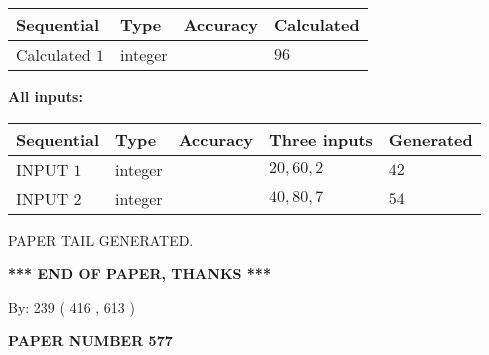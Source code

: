\documentclass{ctexart}
\begin{document}
   
   
   
\noindent{}
   
   
  
  
\noindent\begin{tabular}{|l|l|l|l|}
\hline
 Sequential & Type & Accuracy & Calculated \\ 
\hline
 
 
  Calculated $  1 $ & integer &  & 
  $ 96 $ 
 \\  \hline  
 \end{tabular}
   
   
   
   
\noindent\vspace{0.1in}\hspace{-0.08in} {\textbf{\Large{All inputs: }}}
   
   
  
  
\noindent\begin{tabular}{|l|l|l|l|l|}
\hline
 Sequential & Type & Accuracy & Three inputs & Generated \\ 
\hline
 
 
  INPUT $  1 $ & integer &  & $
 20
 , 
 60
 , 
 2
 $ & $ 42 $ 
 \\  \hline  
 
 
  INPUT $  2 $ & integer &  & $
 40
 , 
 80
 , 
 7
 $ & $ 54 $ 
 \\  \hline  
 \end{tabular}
   
   
   
   
   
   
 \vspace{0.2in}
 
   
   
\vspace{2.0in} PAPER TAIL GENERATED.
   
   
   
   
\vspace{1.0in} 
{\textbf{\large{ *** END OF PAPER, THANKS *** }}} 
   
   
\hspace{1.0in} By: 
 239 ( 416 ,  613 )
   
   
   
   
\newpage 
\setcounter{page}{ 
   577001 } 
   
   
   
   
 {\textbf{ \Large{ PAPER NUMBER  577  }}}
   
\end{document}
